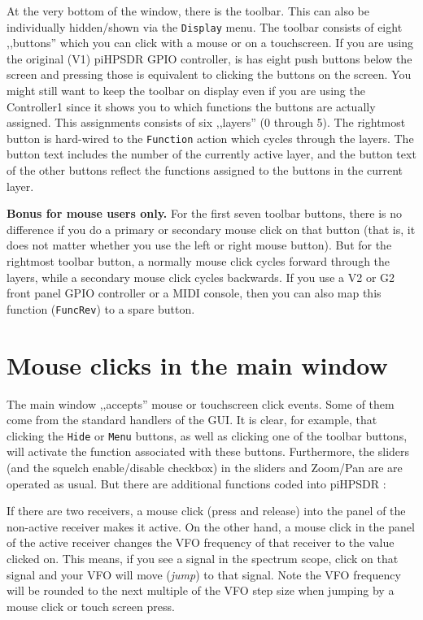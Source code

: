 \documentclass[12pt]{book}
\def\rett#1{\texttt{\color{red}#1}}
\def\bltt#1{\texttt{\color{blue}#1}}
\def\pH{pi\-HPSDR }
\begin{document}
At the very bottom of the window, there is the toolbar. This can also be
individually hidden/shown via the \bltt{Display} menu. The toolbar consists
of eight ,,buttons'' which you can click with a mouse or on a touchscreen.
If you are using the original (V1) \pH GPIO controller, is has eight
push buttons below the screen and pressing those is equivalent to clicking
the buttons on the screen. You might still want to keep the toolbar on display
even if you are using the Controller1 since it shows you to which functions
the buttons are actually assigned. This assignments consists of six ,,layers''
(0 through 5). The rightmost button is hard-wired to the \bltt{Function}
action which cycles through the layers. The button text includes the
number of the currently active layer, and the button text of the other buttons
reflect the functions assigned to the buttons in the current layer.

\textbf{Bonus for mouse users only.} For the first seven toolbar buttons,
there is no difference if you do a primary or secondary mouse click on that
button (that is, it does not matter whether you use the left or right mouse
button). But for the rightmost toolbar button, a normally mouse click cycles
forward through the layers, while a secondary mouse click cycles backwards.
If you use a V2 or G2 front panel GPIO controller or a MIDI console, then you
can also map this function (\bltt{FuncRev}) to a spare button.


\section{Mouse clicks in the main window}
The main window ,,accepts'' mouse or touchscreen click events.
Some of them come from the standard handlers of the GUI. It is
clear, for example, that clicking the \rett{Hide} or
\rett{Menu} buttons, as well as clicking one of the
toolbar buttons, will activate the function associated with
these buttons. Furthermore, the sliders (and the squelch enable/disable
checkbox) in the sliders and Zoom/Pan are are operated as usual.
But there are additional functions coded into \pH:

If there are two receivers, a mouse click (press and release) into
the panel of the non-active receiver makes it active. On the other
hand, a mouse click in the panel of the active receiver changes
the VFO frequency of that receiver to the value clicked on.
This means, if you see a signal in the spectrum scope, click
on that signal and your VFO will move (\textit{jump}) to that signal.
Note the VFO frequency will be  rounded to the next multiple of
the VFO step size when jumping by a mouse  click or
touch screen press.
\end{document}

